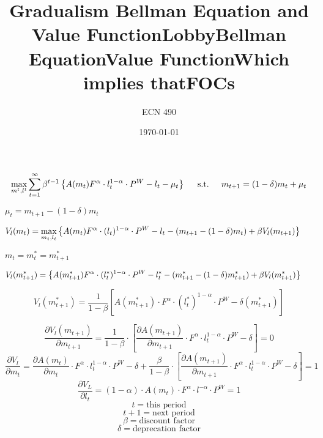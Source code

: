 \documentclass[12pt]{article}
\begin{document}
\title{\vskip-0.6in Gradualism Bellman Equation and Value Function}
\author{ECN 490}
\date{\today}
\maketitle

\title{Lobby}
\[
\max_{m^t,l^t} \sum_{t=1}^\infty \beta^{t-1}\left\{A(m_t)F^\alpha\cdot l^{1-\alpha}_t\cdot P^W-l_t-\mu_t
  \right\} \hskip.2in \text{s.t.} \hskip.2in  m_{t+1}=(1-\delta)m_{t}+\mu_t
\]
\begin{center} $\mu_t=m_{t+1}-(1-\delta)m_{t}$\end{center}

\title{Bellman Equation}
\[
  V_l(m_t)=\max_{m_t,l_t}\left\{A(m_t)F^\alpha\cdot (l_t)^{1-\alpha}\cdot P^W-l_t-(m_{t+1}-(1-\delta)m_t)+\beta V_l(m_{t+1})
  \right\} \hskip.2in 
\]
\begin{center} $m_t=m_t^\ast=m^\ast_{t+1}$\end{center}
\title{Value Function}
\[
  V_l(m_{t+1}^\ast)=\left\{A(m_{t+1}^\ast)F^\alpha\cdot (l^\ast_t)^{1-\alpha}\cdot P^W-l_t^\ast-(m^\ast_{t+1}-(1-\delta)m^\ast_{t+1})+\beta V_l(m^\ast_{t+1})
 \right\} \hskip.2in
\]
\begin{center}\title{Which implies that}\end{center}
\[V_l(m_{t+1}^\ast)=\frac{1}{1-\beta}[A(m_{t+1}^\ast)\cdot F^\alpha\cdot (l^\ast_t)^{1-\alpha}\cdot P^W-\delta(m^\ast_{t+1})]\]
\title{FOCs}

\[\frac{\partial V_l(m_{t+1})}{\partial m_{t+1}}=\frac{1}{1-\beta}\cdot [\frac{\partial A(m_{t+1})}{\partial m_{t+1}}\cdot F^\alpha \cdot l^{1-\alpha}_t \cdot P^W-\delta]=0
\]
\[\frac{\partial V_l}{\partial m_t}=\frac{\partial A(m_t)}{\partial m_t} \cdot F^\alpha \cdot l^{1-\alpha}_t \cdot P^W-\delta+\frac{\beta}{1-\beta}\cdot [\frac{\partial A(m_{t+1})}{\partial m_{t+1}}\cdot F^\alpha \cdot l^{1-\alpha}_t \cdot P^W-\delta]=1
\]
\[
\frac{\partial V_L}{\partial l_t}= (1-\alpha) \cdot A(m_t) \cdot F^\alpha \cdot l^{-\alpha} \cdot P^W =1
\]
\[
t=\text{this period}
\]
\[
t+1=\text{next period}
\]
\[
\beta=\text{discount factor}
\]
\[
\delta=\text{deprecation factor}
\]
\end{document}
